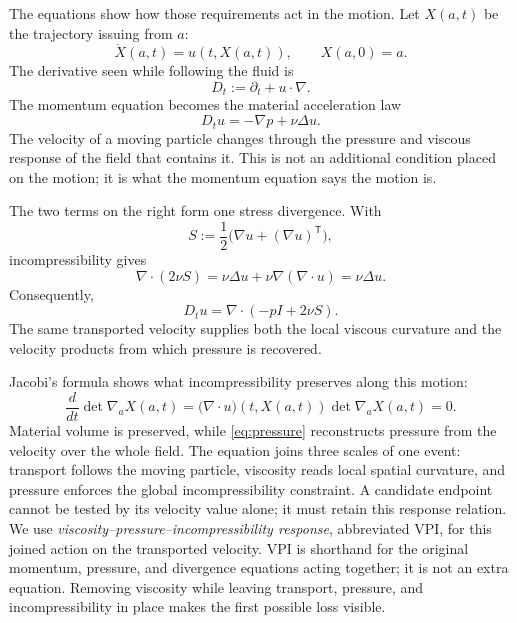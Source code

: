 The equations show how those requirements act in the motion.  Let \(X(a,t)\)
be the trajectory issuing from \(a\):
\begin{equation*}
 \dot X(a,t)=u(t,X(a,t)),
 \qquad X(a,0)=a.
\end{equation*}
The derivative seen while following the fluid is
\begin{equation*}
 D_t:=\partial_t+u\cdot\nabla.
\end{equation*}
The momentum equation becomes the material acceleration law
\begin{equation*}
 D_tu=-\nabla p+\nu\Delta u.
\end{equation*}
The velocity of a moving particle changes through the pressure and viscous
response of the field that contains it.  This is not an additional condition
placed on the motion; it is what the momentum equation says the motion is.

The two terms on the right form one stress divergence.  With
\begin{equation*}
 S:=\frac12\bigl(\nabla u+(\nabla u)^{\mathsf T}\bigr),
\end{equation*}
incompressibility gives
\begin{equation*}
 \nabla\cdot(2\nu S)
 =\nu\Delta u+\nu\nabla(\nabla\cdot u)
 =\nu\Delta u.
\end{equation*}
Consequently,
\begin{equation*}
 D_tu=\nabla\cdot(-pI+2\nu S).
\end{equation*}
The same transported velocity supplies both the local viscous curvature and
the velocity products from which pressure is recovered.

Jacobi's formula shows what incompressibility preserves along this motion:
\begin{equation*}
 \frac d{dt}\det\nabla_aX(a,t)
 =\bigl(\nabla\cdot u\bigr)(t,X(a,t))
  \det\nabla_aX(a,t)=0.
\end{equation*}
Material volume is preserved, while \eqref{eq:pressure} reconstructs pressure
from the velocity over the whole field.  The equation joins three
scales of one event: transport follows the moving particle, viscosity reads
local spatial curvature, and pressure enforces the global incompressibility
constraint.  A candidate endpoint cannot be tested by its velocity value
alone; it must retain this response relation.  We use
\emph{viscosity--pressure--incompressibility response}, abbreviated VPI, for
this joined action on the transported velocity.  VPI is shorthand for the
original momentum, pressure, and divergence equations acting together; it is
not an extra equation.  Removing viscosity while leaving transport, pressure,
and incompressibility in place makes the first possible loss visible.

